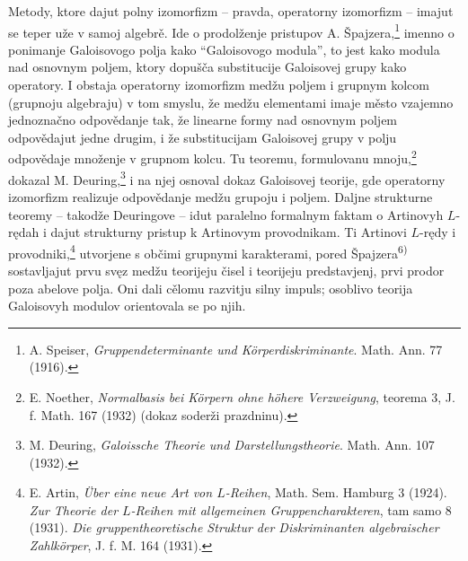 \documentclass[11pt]{article}
\newcommand{\foreign}[1]{#1}
\begin{document}
Metody, ktore dajut polny izomorfizm -- pravda, operatorny izomorfizm -- imajut se teper uže v samoj algebrě. Ide o prodolženje pristupov A. Špajzera,\footnote{A. Speiser, \foreign{\emph{Gruppendeterminante und Körperdiskriminante}}. Math. Ann. 77 (1916).} imenno o ponimanje Galoisovogo polja kako ``Galoisovogo modula'', to jest kako modula nad osnovnym poljem, ktory dopušča substitucije Galoisovej grupy kako operatory. I obstaja operatorny izomorfizm medžu poljem i grupnym kolcom (grupnoju algebraju) v tom smyslu, že medžu elementami imaje město vzajemno jednoznačno odpovědanje tak, že linearne formy nad osnovnym poljem odpovědajut jedne drugim, i že substitucijam Galoisovej grupy v polju odpovědaje množenje v grupnom kolcu. Tu teoremu, formulovanu mnoju,\footnote{E. Noether, \foreign{\emph{Normalbasis bei Körpern ohne höhere Verzweigung}}, teorema 3, J. f. Math. 167 (1932) (dokaz soderži prazdninu).} dokazal M. Deuring,\footnote{M. Deuring, \foreign{\emph{Galoissche Theorie und Darstellungstheorie}}. Math. Ann. 107 (1932).} i na njej osnoval dokaz Galoisovej teorije, gde operatorny izomorfizm realizuje odpovědanje medžu grupoju i poljem. Daljne strukturne teoremy -- takodže Deuringove -- idut paralelno formalnym faktam o Artinovyh \(L\)-rędah i dajut strukturny pristup k Artinovym provodnikam. Ti Artinovi \(L\)-rędy i provodniki,\footnote{E. Artin, \foreign{\emph{Über eine neue Art von \(L\)-Reihen}}, Math. Sem. Hamburg 3 (1924). \foreign{\emph{Zur Theorie der \(L\)-Reihen mit allgemeinen Gruppencharakteren}}, tam samo 8 (1931). \foreign{\emph{Die gruppentheoretische Struktur der Diskriminanten algebraischer Zahlkörper}}, J. f. M. 164 (1931).} utvorjene s občimi grupnymi karakterami, pored Špajzera\textsuperscript{6)} sostavljajut prvu svęz medžu teorijeju čisel i teorijeju predstavjenj, prvi prodor poza abelove polja. Oni dali cělomu razvitju silny impuls; osoblivo teorija Galoisovyh modulov orientovala se po njih.
\end{document}
